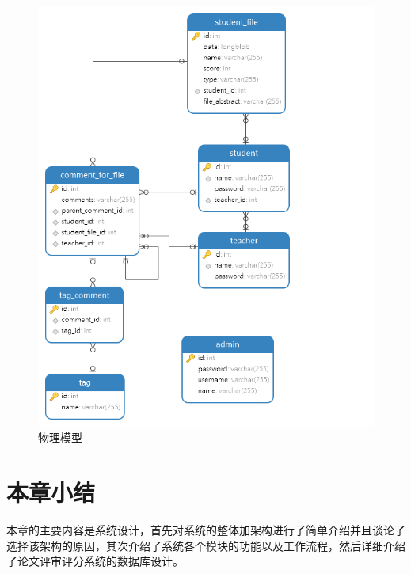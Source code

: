 \begin{figure}[H]
    \centering
    \includegraphics[scale = 0.6]{out/uml/数据库/physical-model.png}
    \caption{\song\wuhao 物理模型}
    \label{physical-model}
\end{figure}

\section{本章小结}

本章的主要内容是系统设计，首先对系统的整体加架构进行了简单介绍并且谈论了选择该架构的原因，其次介绍了系统各个模块的功能以及工作流程，然后详细介绍了论文评审评分系统的数据库设计。
